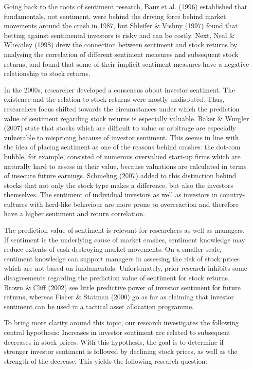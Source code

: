 \par
Going back to the roots of sentiment research, Baur et al. (1996) established that fundamentals, not sentiment, were behind the driving force behind market movements around the crash in 1987, but Shleifer \& Vishny (1997) found that betting against sentimental investors is risky and can be costly. Next, Neal \& Wheatley (1998) drew the connection between sentiment and stock returns by analysing the correlation of different sentiment measures and subsequent stock returns, and found that some of their implicit sentiment measures have a negative relationship to stock returns.
\par
In the 2000s, researcher developed a consensus about investor sentiment. The existence and the relation to stock returns were mostly undisputed. Thus, researchers focus shifted towards the circumstances under which the prediction value of sentiment regarding stock returns is especially valuable. Baker \& Wurgler (2007) state that stocks which are difficult to value or arbitrage are especially vulnerable to mispricing because of investor sentiment. This seems in line with the idea of placing sentiment as one of the reasons behind crashes: the dot-com bubble, for example, consisted of numerous overvalued start-up firms which are naturally hard to assess in their value, because valuations are calculated in terms of insecure future earnings. Schmeling (2007) added to this distinction behind stocks that not only the stock type makes a difference, but also the investors themselves. The sentiment of individual investors as well as investors in country-cultures with herd-like behaviour are more prone to overreaction and therefore have a higher sentiment and return correlation.
\par
The prediction value of sentiment is relevant for researchers as well as managers. If sentiment is the underlying cause of market crashes, sentiment knowledge may reduce extents of cash-destroying market movements. On a smaller scale, sentiment knowledge can support managers in assessing the risk of stock prices which are not based on fundamentals. Unfortunately, prior research inhibits some disagreements regarding the prediction value of sentiment for stock returns. Brown \& Cliff (2002) see little predictive power of investor sentiment for future returns, whereas Fisher \& Statman (2000) go as far as claiming that investor sentiment can be used in a tactical asset allocation programme. 
\par
To bring more clarity around this topic, our research investigates the following central hypothesis: Increases in investor sentiment are related to subsequent decreases in stock prices. With this hypothesis, the goal is to determine if stronger investor sentiment is followed by declining stock prices, as well as the strength of the decrease. This yields the following research question:


